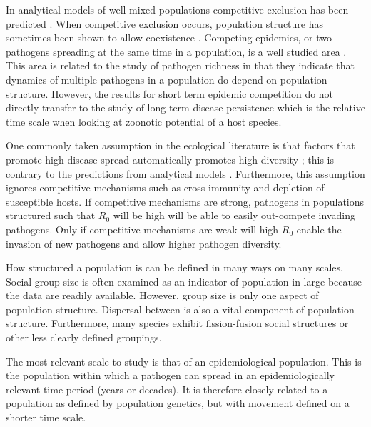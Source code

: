 In analytical models of well mixed populations competitive exclusion has been predicted \cite{ackleh2003competitive, bremermann1989competitive, martcheva2013competitive, qiu2013vector, allen2004sis}.
When competitive exclusion occurs, population structure has sometimes been shown to allow coexistence \cite{qiu2013vector, allen2004sis, nunes2006localized, garmer2016multistrain}.
Competing epidemics, or two pathogens spreading at the same time in a population, is a well studied area \cite{poletto2013host, poletto2015characterising, karrer2011competing}. 
This area is related to the study of pathogen richness in that they indicate that dynamics of multiple pathogens in a population do depend on population structure.
However, the results for short term epidemic competition do not directly transfer to the study of long term disease persistence which is the relative time scale when looking at zoonotic potential of a host species.


One commonly taken assumption in the ecological literature is that factors that promote high disease spread automatically promotes high diversity \cite{nunn2003comparative, morand2000wormy, poulin2014parasite, poulin2000diversity, altizer2003social}; this is contrary to the predictions from analytical models \cite{qiu2013vector, allen2004sis, nunes2006localized}. 
Furthermore, this assumption ignores competitive mechanisms such as cross-immunity and depletion of susceptible hosts.
If competitive mechanisms are strong, pathogens in populations structured such that $R_0$ will be high will be able to easily out-compete invading pathogens.
Only if competitive mechanisms are weak will high $R_0$  enable the invasion of new pathogens and allow higher pathogen diversity.


How structured a population is can be defined in many ways on many scales.
Social group size is often examined as an indicator of population in large because the data are readily available.
However, group size is only one aspect of population structure.
Dispersal between is also a vital component of population structure.
Furthermore, many species exhibit fission-fusion social structures or other less clearly defined groupings.

The most relevant scale to study is that of an epidemiological population.
This is the population within which a pathogen can spread in an epidemiologically relevant time period (years or decades).
It is therefore closely related to a population as defined by population genetics, but with movement defined on a shorter time scale.

